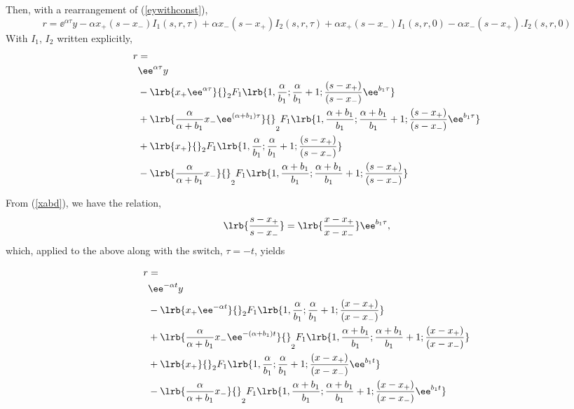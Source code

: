 Then, with a rearrangement of (\ref{eywithconst}),
\begin{equation*}
r = \ee^{\alpha\tau }y - \alpha x_+(s-x_-)I_1(s,r,\tau) + \alpha x_- (s-x_+) I_2(s,r,\tau) +  \alpha x_+(s-x_-)I_1(s,r,0) - \alpha x_- (s-x_+). I_2(s,r,0)
\end{equation*}
With $I_1$, $I_2$ written explicitly,
\begin{align*}
r &= \\
 &\ee^{\alpha\tau }y\\
 &- \lrb{x_+ \ee^{\alpha\tau}}{}_2 F_1 \lrb{1,\frac{\alpha}{b_1 };\frac{\alpha}{b_1 }+1; \frac{(s-x_+)}{(s-x_-)}\ee^{b_1  \tau}}\\
&+\lrb{\frac{\alpha  }{\alpha + b_1}x_-\ee^{(\alpha + b_1)\tau}}{}_2F_1\lrb{1,\frac{\alpha + b_1 }{b_1 };\frac{\alpha + b_1 }{b_1 }+1; \frac{(s-x_+)}{(s-x_-)}\ee^{b_1  \tau}}\\
&+ \lrb{x_+}{}_2 F_1 \lrb{1,\frac{\alpha}{b_1 };\frac{\alpha}{b_1 }+1; \frac{(s-x_+)}{(s-x_-)}}\\
&- \lrb{\frac{\alpha  }{\alpha + b_1}x_-}{}_2F_1\lrb{1,\frac{\alpha + b_1 }{b_1 };\frac{\alpha + b_1 }{b_1 }+1; \frac{(s-x_+)}{(s-x_-)}}
\end{align*}

\noindent
From (\ref{xabd}), we have the relation,
$$\lrb{\frac{s-x_+}{s-x_-}} = \lrb{\frac{x-x_+}{x-x_-}}\ee^{b_1\tau},$$
which, applied to the above along with the switch, $\tau = -t$, yields

\begin{align*}
r &= \\
 &\ee^{-\alpha t }y\\
 &- \lrb{x_+ \ee^{-\alpha t}}{}_2 F_1 \lrb{1,\frac{\alpha}{b_1 };\frac{\alpha}{b_1 }+1; \frac{(x-x_+)}{(x-x_-)}}\\
&+\lrb{\frac{\alpha  }{\alpha + b_1}x_-\ee^{-(\alpha + b_1)t}}{}_2F_1\lrb{1,\frac{\alpha + b_1 }{b_1 };\frac{\alpha + b_1 }{b_1 }+1; \frac{(x-x_+)}{(x-x_-)}}\\
&+ \lrb{x_+}{}_2 F_1 \lrb{1,\frac{\alpha}{b_1 };\frac{\alpha}{b_1 }+1; \frac{(x-x_+)}{(x-x_-)}\ee^{b_1  t}}\\
&- \lrb{\frac{\alpha  }{\alpha + b_1}x_-}{}_2F_1\lrb{1,\frac{\alpha + b_1 }{b_1 };\frac{\alpha + b_1 }{b_1 }+1; \frac{(x-x_+)}{(x-x_-)}\ee^{b_1  t}}
\end{align*}

